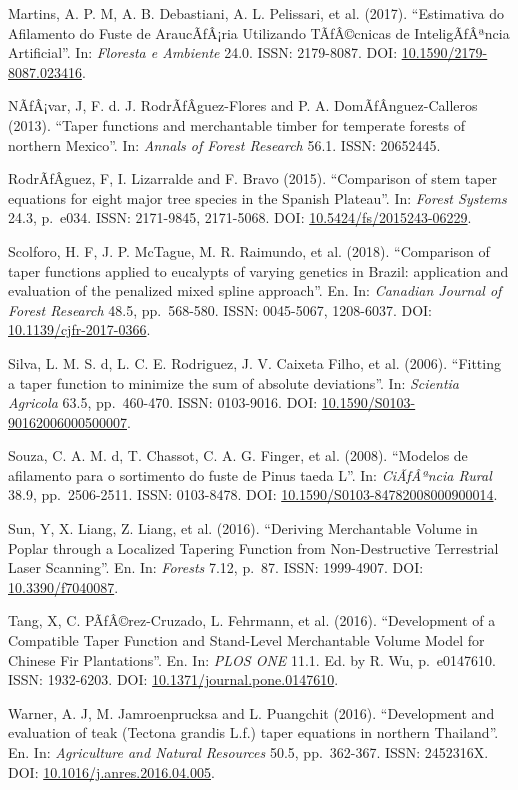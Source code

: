 \documentclass[]{article}
\begin{document}
Martins, A. P. M, A. B. Debastiani, A. L. Pelissari, et al. (2017).
``Estimativa do Afilamento do Fuste de AraucÃƒÂ¡ria Utilizando
TÃƒÂ©cnicas de InteligÃƒÂªncia Artificial''. In: \emph{Floresta e
Ambiente} 24.0. ISSN: 2179-8087. DOI:
\href{https://doi.org/10.1590/2179-8087.023416}{10.1590/2179-8087.023416}.

NÃƒÂ¡var, J, F. d. J. RodrÃƒÂ­guez-Flores and P. A.
DomÃƒÂ­nguez-Calleros (2013). ``Taper functions and merchantable timber
for temperate forests of northern Mexico''. In: \emph{Annals of Forest
Research} 56.1. ISSN: 20652445.

RodrÃƒÂ­guez, F, I. Lizarralde and F. Bravo (2015). ``Comparison of stem
taper equations for eight major tree species in the Spanish Plateau''.
In: \emph{Forest Systems} 24.3, p.~e034. ISSN: 2171-9845, 2171-5068.
DOI:
\href{https://doi.org/10.5424/fs/2015243-06229}{10.5424/fs/2015243-06229}.

Scolforo, H. F, J. P. McTague, M. R. Raimundo, et al. (2018).
``Comparison of taper functions applied to eucalypts of varying genetics
in Brazil: application and evaluation of the penalized mixed spline
approach''. En. In: \emph{Canadian Journal of Forest Research} 48.5,
pp.~568-580. ISSN: 0045-5067, 1208-6037. DOI:
\href{https://doi.org/10.1139/cjfr-2017-0366}{10.1139/cjfr-2017-0366}.

Silva, L. M. S. d, L. C. E. Rodriguez, J. V. Caixeta Filho, et al.
(2006). ``Fitting a taper function to minimize the sum of absolute
deviations''. In: \emph{Scientia Agricola} 63.5, pp.~460-470. ISSN:
0103-9016. DOI:
\href{https://doi.org/10.1590/S0103-90162006000500007}{10.1590/S0103-90162006000500007}.

Souza, C. A. M. d, T. Chassot, C. A. G. Finger, et al. (2008). ``Modelos
de afilamento para o sortimento do fuste de Pinus taeda L''. In:
\emph{CiÃƒÂªncia Rural} 38.9, pp.~2506-2511. ISSN: 0103-8478. DOI:
\href{https://doi.org/10.1590/S0103-84782008000900014}{10.1590/S0103-84782008000900014}.

Sun, Y, X. Liang, Z. Liang, et al. (2016). ``Deriving Merchantable
Volume in Poplar through a Localized Tapering Function from
Non-Destructive Terrestrial Laser Scanning''. En. In: \emph{Forests}
7.12, p.~87. ISSN: 1999-4907. DOI:
\href{https://doi.org/10.3390/f7040087}{10.3390/f7040087}.

Tang, X, C. PÃƒÂ©rez-Cruzado, L. Fehrmann, et al. (2016). ``Development
of a Compatible Taper Function and Stand-Level Merchantable Volume Model
for Chinese Fir Plantations''. En. In: \emph{PLOS ONE} 11.1. Ed. by R.
Wu, p.~e0147610. ISSN: 1932-6203. DOI:
\href{https://doi.org/10.1371/journal.pone.0147610}{10.1371/journal.pone.0147610}.

Warner, A. J, M. Jamroenprucksa and L. Puangchit (2016). ``Development
and evaluation of teak (Tectona grandis L.f.) taper equations in
northern Thailand''. En. In: \emph{Agriculture and Natural Resources}
50.5, pp.~362-367. ISSN: 2452316X. DOI:
\href{https://doi.org/10.1016/j.anres.2016.04.005}{10.1016/j.anres.2016.04.005}.
\end{document}
